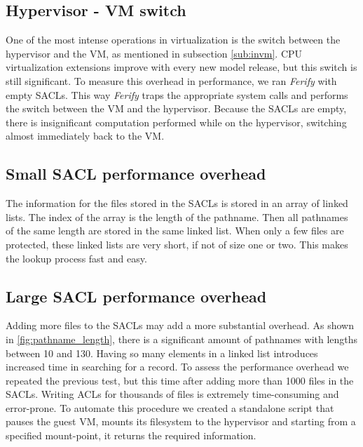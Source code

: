 \subsection{Hypervisor - \ac{VM} switch}

\par One of the most intense operations in virtualization is the switch between the hypervisor and the \ac{VM}, as mentioned in subsection \ref{sub:invm}. \ac{CPU} virtualization extensions improve with every new model release, but this switch is still significant. To measure this overhead in performance, we ran \emph{Ferify} with empty \acp{SACL}. This way \emph{Ferify} traps the appropriate system calls and performs the switch between the \ac{VM} and the hypervisor. Because the \acp{SACL} are empty, there is insignificant computation performed while on the hypervisor, switching almost immediately back to the \ac{VM}. 


\subsection{Small \ac{SACL} performance overhead}

\par The information for the files stored in the \acp{SACL} is stored in an array of linked lists. The index of the array is the length of the pathname. Then all pathnames of the same length are stored in the same linked list. When only a few files are protected, these linked lists are very short, if not of size one or two. This makes the lookup process fast and easy. 

\subsection{Large \ac{SACL} performance overhead}

\par Adding more files to the \acp{SACL} may add a more substantial overhead. As shown in \ref{fig:pathname_length}, there is a significant amount of pathnames with lengths between 10 and 130. Having so many elements in a linked list introduces increased time in searching for a record. To assess the performance overhead we repeated the previous test, but this time after adding more than 1000 files in the \acp{SACL}. Writing \acp{ACL} for thousands of files is extremely time-consuming and error-prone. To automate this procedure we created a standalone script that pauses the guest \ac{VM}, mounts its filesystem to the hypervisor and starting from a specified mount-point, it returns the required information. 


